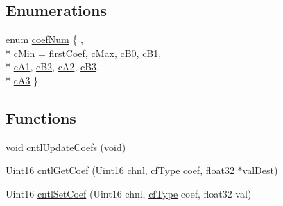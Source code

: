 \subsection*{Enumerations}
\begin{DoxyCompactItemize}
\item 
enum \hyperlink{a00009_a4b8f446b389413b175ff4d4dbcd18da1}{coef\-Num} \{ , \\*
\hyperlink{a00009_a4b8f446b389413b175ff4d4dbcd18da1ad15b967851188a21b2d4fd326304bf83}{c\-Min} = first\-Coef, 
\hyperlink{a00009_a4b8f446b389413b175ff4d4dbcd18da1a3576a9eb4b8f9d1ca3d31a0f9b889299}{c\-Max}, 
\hyperlink{a00009_a4b8f446b389413b175ff4d4dbcd18da1a3dec162fc3f68f49f43775eba612e110}{c\-B0}, 
\hyperlink{a00009_a4b8f446b389413b175ff4d4dbcd18da1a43986b141584b760c8c8c9fc29304de2}{c\-B1}, 
\\*
\hyperlink{a00009_a4b8f446b389413b175ff4d4dbcd18da1aac28a7344b33c5e968a79fc27078da99}{c\-A1}, 
\hyperlink{a00009_a4b8f446b389413b175ff4d4dbcd18da1a5229cb73bab727c5aeaae425a4fd2472}{c\-B2}, 
\hyperlink{a00009_a4b8f446b389413b175ff4d4dbcd18da1a80d8d6d72b42fa8603b71cba71e13ef2}{c\-A2}, 
\hyperlink{a00009_a4b8f446b389413b175ff4d4dbcd18da1aaf02fe4d8a1a90d96d8ceb29c6face14}{c\-B3}, 
\\*
\hyperlink{a00009_a4b8f446b389413b175ff4d4dbcd18da1a23a7967c17fd0f99330009d84750ff62}{c\-A3}
 \}
\end{DoxyCompactItemize}
\subsection*{Functions}
\begin{DoxyCompactItemize}
\item 
void \hyperlink{a00009_ac82b19f3b880ae3bbed395b3194d709e}{cntl\-Update\-Coefs} (void)
\item 
Uint16 \hyperlink{a00009_abc7c9f468b60d7348e835e6473a34b23}{cntl\-Get\-Coef} (Uint16 chnl, \hyperlink{a00009_ac340fbbc5919954c173757935549588f}{cf\-Type} coef, float32 $\ast$val\-Dest)
\item 
Uint16 \hyperlink{a00009_a1b0f822cb4344a66c433d36c8eee2be3}{cntl\-Set\-Coef} (Uint16 chnl, \hyperlink{a00009_ac340fbbc5919954c173757935549588f}{cf\-Type} coef, float32 val)
\end{DoxyCompactItemize}
